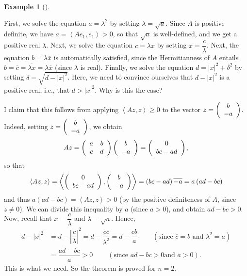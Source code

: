 \documentclass[numbers=enddot,12pt,final,onecolumn,notitlepage]{scrartcl}%
\numberwithin{exer}{subsection}
\theoremstyle{definition}
\newtheorem{exam}[theo]{Example}
\newenvironment{example}[1][]
{\begin{exam}[#1]\begin{leftbar}}
{\end{leftbar}\end{exam}}
\begin{document}
\begin{example}
First, we solve the equation $a=\lambda^{2}$ by setting $\lambda=\sqrt{a}$.
Since $A$ is positive definite, we have $a=\left\langle Ae_{1},e_{1}%
\right\rangle >0$, so that $\sqrt{a}$ is well-defined, and we get a positive
real $\lambda$. Next, we solve the equation $c=\lambda x$ by setting
$x=\dfrac{c}{\lambda}$. Next, the equation $b=\lambda\overline{x}$ is
automatically satisfied, since the Hermitianness of $A$ entails $b=\overline
{c}=\overline{\lambda x}=\lambda\overline{x}$ (since $\lambda$ is real).
Finally, we solve the equation $d=\left\vert x\right\vert ^{2}+\delta^{2}$ by
setting $\delta=\sqrt{d-\left\vert x\right\vert ^{2}}$. Here, we need to
convince ourselves that $d-\left\vert x\right\vert ^{2}$ is a positive real,
i.e., that $d>\left\vert x\right\vert ^{2}$. Why is this the case?

I claim that this follows from applying $\left\langle Az,z\right\rangle \geq0$
to the vector $z=\left(
\begin{array}
[c]{c}%
b\\
-a
\end{array}
\right)  $. Indeed, setting $z=\left(
\begin{array}
[c]{c}%
b\\
-a
\end{array}
\right)  $, we obtain%
\[
Az=\left(
\begin{array}
[c]{cc}%
a & b\\
c & d
\end{array}
\right)  \left(
\begin{array}
[c]{c}%
b\\
-a
\end{array}
\right)  =\left(
\begin{array}
[c]{c}%
0\\
bc-ad
\end{array}
\right)  ,
\]
so that%
\[
\left\langle Az,z\right\rangle =\left\langle \left(
\begin{array}
[c]{c}%
0\\
bc-ad
\end{array}
\right)  ,\left(
\begin{array}
[c]{c}%
b\\
-a
\end{array}
\right)  \right\rangle =\left(  bc-ad\right)  \overline{-a}=a\left(
ad-bc\right)
\]
and thus $a\left(  ad-bc\right)  =\left\langle Az,z\right\rangle >0$ (by the
positive definiteness of $A$, since $z\neq0$). We can divide this inequality
by $a$ (since $a>0$), and obtain $ad-bc>0$. Now, recall that $x=\dfrac
{c}{\lambda}$ and $\lambda=\sqrt{a}$. Hence,%
\begin{align*}
d-\left\vert x\right\vert ^{2}  & =d-\left\vert \dfrac{c}{\lambda}\right\vert
^{2}=d-\dfrac{c\overline{c}}{\lambda^{2}}=d-\dfrac{cb}{a}%
\ \ \ \ \ \ \ \ \ \ \left(  \text{since }\overline{c}=b\text{ and }\lambda
^{2}=a\right)  \\
& =\dfrac{ad-bc}{a}>0\ \ \ \ \ \ \ \ \ \ \left(  \text{since }ad-bc>0\text{
and }a>0\right)  .
\end{align*}
This is what we need. So the theorem is proved for $n=2$.
\end{example}
\end{document}
